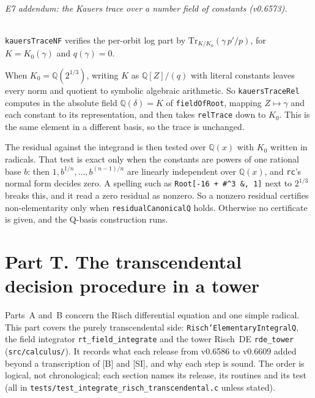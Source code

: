 \documentclass[11pt]{article}
\theoremstyle{definition}
\theoremstyle{remark}
\newcommand{\Q}{\mathbb{Q}}
\newcommand{\code}[1]{\texttt{#1}}
\begin{document}
\paragraph{E7 addendum: the Kauers trace over a number field of constants (v0.6573).}
\code{kauersTraceNF} verifies the per-orbit log part by
$\mathrm{Tr}_{K/K_0}(\gamma\,p'/p)$, for $K=K_0(\gamma)$ and $q(\gamma)=0$.

When $K_0=\Q(2^{1/3})$, writing $K$ as $\Q[Z]/(q)$ with literal constants
leaves every norm and quotient to symbolic algebraic arithmetic. So
\code{kauersTraceRel} computes in the absolute field $\Q(\delta)=K$ of
\code{fieldOfRoot}, mapping $Z\mapsto\gamma$ and each constant to its
representation, and then takes \code{relTrace} down to $K_0$. This is the same
element in a different basis, so the trace is unchanged.

The residual against the integrand is then tested over $\Q(x)$ with $K_0$ written
in radicals. That test is exact only when the constants are powers of one rational
base $b$: then $1,b^{1/n},\dots,b^{(n-1)/n}$ are linearly independent over
$\Q(x)$, and \code{rc}'s normal form decides zero. A spelling such as
\code{Root[-16 + \#\^{}3 \&, 1]} next to $2^{1/3}$ breaks this, and it read a
zero residual as nonzero. So a nonzero residual certifies non-elementarity only
when \code{residualCanonicalQ} holds. Otherwise no certificate is given, and the
Q-basis construction runs.

\part*{Part T. The transcendental decision procedure in a tower}

Parts~A and~B concern the Risch differential equation and one simple radical. This
part covers the purely transcendental side: \code{Risch`ElementaryIntegralQ}, the
field integrator \code{rt\_field\_integrate} and the tower Risch~DE \code{rde\_tower}
(\code{src/calculus/}). It records what each release from v0.6586 to v0.6609 added
beyond a transcription of [B] and [SI], and why each step is sound. The order is
logical, not chronological; each section names its release, its routines and its
test (all in \code{tests/test\_integrate\_risch\_transcendental.c} unless stated).
\end{document}
